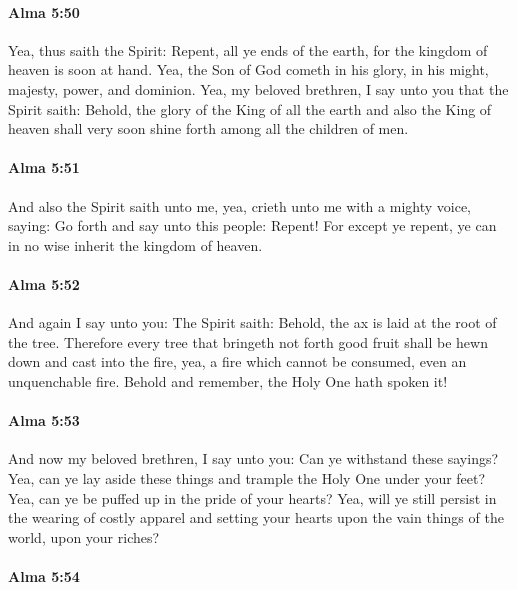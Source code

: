 		\paragraph{Alma 5:50} %
			\label{ALMA-5-50}

			Yea, thus saith the Spirit:
			Repent, all ye ends of the earth,
			for the kingdom of heaven is soon at hand.
			Yea, the Son of God cometh in his glory,
			in his might, majesty, power, and dominion.
			Yea, my beloved brethren, I say unto you that the Spirit saith:
			Behold, the glory of the King of all the earth and also the King of heaven
			shall very soon shine forth among all the children of men.

		\paragraph{Alma 5:51} %
			\label{ALMA-5-51}

			And also the Spirit saith unto me,
			yea, crieth unto me with a mighty voice, saying:
			Go forth and say unto this people: Repent!
			For except ye repent, ye can in no wise inherit the kingdom of heaven.

		\paragraph{Alma 5:52} %
			\label{ALMA-5-52}

			And again I say unto you:
			The Spirit saith:
			Behold, the ax is laid at the root of the tree.
			Therefore every tree that bringeth not forth good fruit
			shall be hewn down and cast into the fire,
			yea, a fire which cannot be consumed,
			even an unquenchable fire.
			Behold and remember, the Holy One hath spoken it!

		\paragraph{Alma 5:53} %
			\label{ALMA-5-53}

			And now my beloved brethren, I say unto you:
			Can ye withstand these sayings?
			Yea, can ye lay aside these things
			and trample the Holy One under your feet?
			Yea, can ye be puffed up in the pride of your hearts?
			Yea, will ye still persist in the wearing of costly apparel
			and setting your hearts upon the vain things of the world, upon your riches?

		\paragraph{Alma 5:54} %
			\label{ALMA-5-54}

